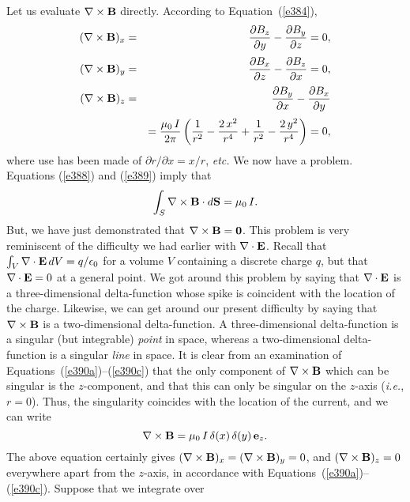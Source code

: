 Let us evaluate $\nabla\times {\bf B} $ directly. According to Equation~(\ref{e384}),
\begin{eqnarray}\label{e390a}
(\nabla\times{\bf B})_x &=& \frac{\partial B_z}{\partial y} - \frac{\partial B_y}
{\partial z} = 0,\\[0.5ex]
(\nabla\times{\bf B})_y &=&  \frac{\partial B_x}{\partial z} - \frac{\partial B_z}
{\partial x} = 0,\\[0.5ex]
(\nabla\times {\bf B})_z &=&  \frac{\partial B_y}{\partial x} - \frac{\partial B_x}
{\partial y} \nonumber\\[0.5ex]&&= \frac{\mu_0\, I}{2\pi} \left(
\frac{1}{r^2} - \frac{2\,x^2}{r^4} +\frac{1}{r^2} -\frac{2 \,y^2}{r^4}\right) =0,\label{e390c}
\end{eqnarray}
where use has been made of $\partial r/\partial x = x/r$, {\em etc.} We now have a problem.
Equations (\ref{e388}) and (\ref{e389}) imply that
\begin{equation}
\int_S \nabla\times {\bf B} \cdot d{\bf S} = \mu_0 \,I.\label{e391}
\end{equation}
But,  we have just demonstrated that $\nabla\times{\bf B} = {\bf 0}$. This problem
is very reminiscent of the difficulty we had earlier with ${\nabla}\cdot {\bf E}$. 
Recall that $\int_V {\nabla}\cdot {\bf E} \,dV= q/\epsilon_0$ for a volume $V$ containing
a discrete charge $q$, but that $\nabla \cdot{\bf E} = 0$ at a general point.
We got around this problem
 by saying that $\nabla\cdot {\bf E}$ is a three-dimensional
delta-function whose spike is  coincident with the location of the charge. 
Likewise, we can get around our present difficulty by saying that $\nabla\times
{\bf B}$ is a two-dimensional delta-function. A three-dimensional delta-function
is a singular (but integrable) {\em point} in space, whereas a two-dimensional 
delta-function is a singular {\em line} in space. 
It is clear from an examination of Equations~(\ref{e390a})--(\ref{e390c}) that the only component of
$\nabla\times{\bf B}$ which can be singular is the $z$-component, and that this
can only be singular on the $z$-axis ({\em i.e.}, $r=0$).
Thus,  the singularity
coincides with the location of the current, and we can write 
\begin{equation}
\nabla\times{\bf B} = \mu_0 \,I\,\delta(x)\,\delta(y)\,{\bf e}_z.\label{e392}
\end{equation}
The above equation certainly gives $(\nabla\times{\bf B})_x
=(\nabla\times{\bf B})_y = 0$,  and $(\nabla\times{\bf B})_z=0$ everywhere apart
from the $z$-axis, in accordance with Equations~(\ref{e390a})--(\ref{e390c}). Suppose that we integrate over
